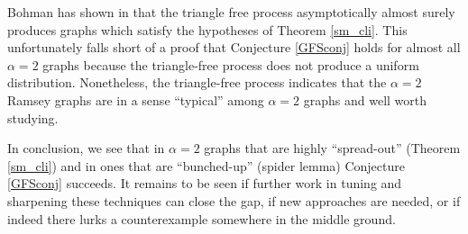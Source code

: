 Bohman has shown in \cite{bohman} that the triangle free process asymptotically almost surely produces graphs which satisfy the hypotheses of Theorem \ref{sm_cli}.  This unfortunately falls short of a proof that Conjecture \ref{GFSconj} holds for almost all $\alpha = 2$ graphs because the triangle-free process does not produce a uniform distribution.  Nonetheless, the triangle-free process indicates that the $\alpha = 2$ Ramsey graphs are in a sense ``typical'' among $\alpha = 2$ graphs and well worth studying.  

In conclusion, we see that in $\alpha = 2$ graphs that are highly ``spread-out'' (Theorem \ref{sm_cli}) and in ones that are ``bunched-up'' (spider lemma) Conjecture \ref{GFSconj} succeeds.   It remains to be seen if further work in tuning and sharpening these techniques can close the gap, if new approaches are needed, or if indeed there lurks a counterexample somewhere in the middle ground.



